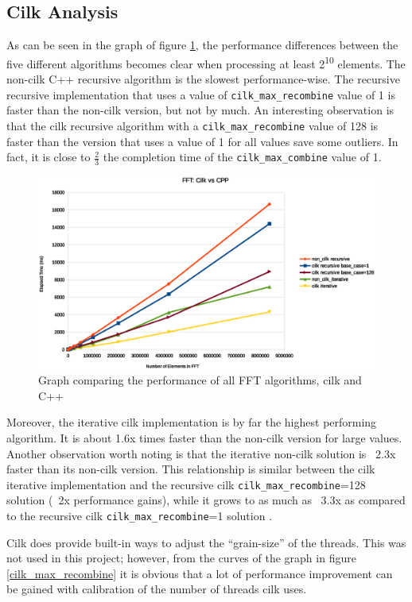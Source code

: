 \subsection{Cilk Analysis}
As can be seen in the graph of figure \ref{fft_cilk_cpp}, the performance differences between the five different algorithms becomes clear when processing at least 2\textsuperscript{10} elements. The non-cilk C++ recursive algorithm is the slowest performance-wise. The recursive recursive  implementation that uses a value of \texttt{cilk\_max\_recombine} value of 1 is faster than the non-cilk version, but not by much. An interesting observation is that the cilk recursive algorithm with a \texttt{cilk\_max\_recombine} value of 128 is faster than the version that uses a value of 1 for all values save some outliers. In fact, it is close to \( \frac{2}{3} \) the completion time of the \texttt{cilk\_max\_combine} value of 1.

\begin{figure}
\center
\includegraphics[scale=0.6]{img/fft_cilk_cpp.eps}
\caption{Graph comparing the performance of all FFT algorithms, cilk and C++} 
\label{fft_cilk_cpp}
\end{figure}

Moreover, the iterative cilk implementation is by far the highest performing algorithm. It is about 1.6x times faster than the non-cilk version for large values. Another observation worth noting is that the iterative non-cilk solution is ~2.3x faster than its non-cilk version. This relationship is similar between the cilk iterative implementation and the recursive cilk \texttt{cilk\_max\_recombine}=128 solution (~2x performance gains), while it grows to as much as ~3.3x as compared to the recursive cilk \texttt{cilk\_max\_recombine}=1 solution . 

Cilk does provide built-in ways to adjust the “grain-size” of the threads. This was not used in this project; however, from the curves of the graph in figure \ref{cilk_max_recombine} it is obvious that a lot of performance improvement can be gained with calibration of the number of threads cilk uses. 

